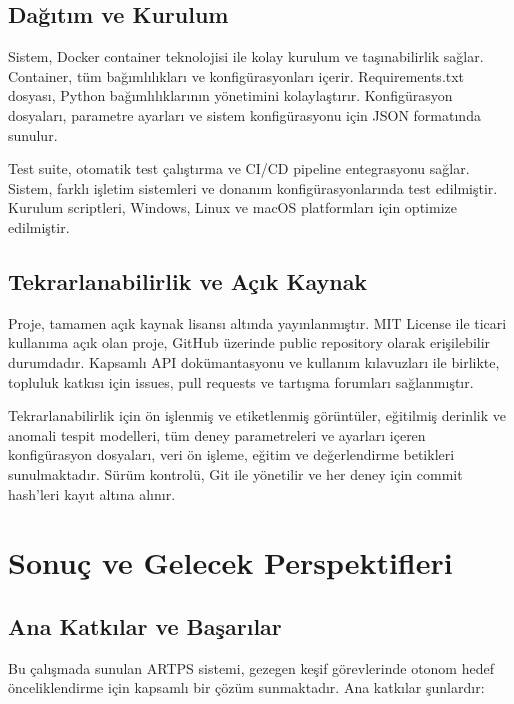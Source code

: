 \documentclass[12pt]{article}
\begin{document}
\subsection{Dağıtım ve Kurulum}
Sistem, Docker container teknolojisi ile kolay kurulum ve taşınabilirlik sağlar. Container, tüm bağımlılıkları ve konfigürasyonları içerir. Requirements.txt dosyası, Python bağımlılıklarının yönetimini kolaylaştırır. Konfigürasyon dosyaları, parametre ayarları ve sistem konfigürasyonu için JSON formatında sunulur.

Test suite, otomatik test çalıştırma ve CI/CD pipeline entegrasyonu sağlar. Sistem, farklı işletim sistemleri ve donanım konfigürasyonlarında test edilmiştir. Kurulum scriptleri, Windows, Linux ve macOS platformları için optimize edilmiştir.

\subsection{Tekrarlanabilirlik ve Açık Kaynak}
Proje, tamamen açık kaynak lisansı altında yayınlanmıştır. MIT License ile ticari kullanıma açık olan proje, GitHub üzerinde public repository olarak erişilebilir durumdadır. Kapsamlı API dokümantasyonu ve kullanım kılavuzları ile birlikte, topluluk katkısı için issues, pull requests ve tartışma forumları sağlanmıştır.

Tekrarlanabilirlik için ön işlenmiş ve etiketlenmiş görüntüler, eğitilmiş derinlik ve anomali tespit modelleri, tüm deney parametreleri ve ayarları içeren konfigürasyon dosyaları, veri ön işleme, eğitim ve değerlendirme betikleri sunulmaktadır. Sürüm kontrolü, Git ile yönetilir ve her deney için commit hash'leri kayıt altına alınır.

\section{Sonuç ve Gelecek Perspektifleri}
\subsection{Ana Katkılar ve Başarılar}
Bu çalışmada sunulan ARTPS sistemi, gezegen keşif görevlerinde otonom hedef önceliklendirme için kapsamlı bir çözüm sunmaktadır. Ana katkılar şunlardır:
\end{document}
